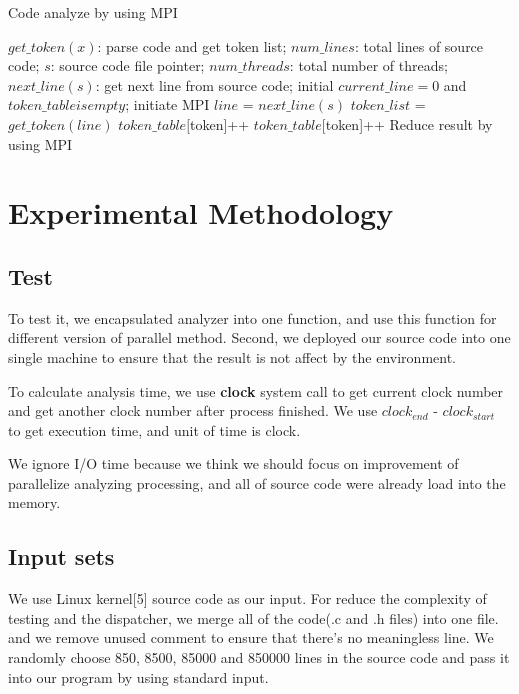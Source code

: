 \documentclass{acm_proc_article-sp}
\begin{document}
\begin{algorithm}[h]
\caption{Code analyze by using MPI}
\begin{algorithmic}[1]
\Require
$get\_token(x)$: parse code and get token list;
$num\_lines$: total lines of source code;
$s$: source code file pointer;
$num\_threads$: total number of threads;
$next\_line(s)$: get next line from source code;
			\State initial $current\_line=0$ and $token\_table is empty$;
			\State initiate MPI
            \State $line$ = $next\_line(s)$
			\State $token\_list$ = $get\_token(line)$
					\State $token\_table[$token]++
				\EndFor
			\EndIf
					\State $token\_table[$token]++
				\EndFor
			\EndIf
			\State Reduce result by using MPI
		\end{algorithmic}
\end{algorithm}


\section{Experimental Methodology}
\subsection{Test}
	To test it, we encapsulated analyzer into one function, and use this function for different
	version of parallel method.
	Second, we deployed our source code into one single machine to ensure that the result
	is not affect by the environment.

	To calculate analysis time, we use \textbf{clock} system call to get current clock number
	and get another clock number after process finished. We use \textit{$clock_{end}$} - \textit{$clock_{start}$}
	to get execution time, and unit of time is clock.

	We ignore I/O time because we think we should focus on improvement of parallelize analyzing
	processing, and all of source code were already load into the memory.
\subsection{Input sets}
	We use Linux kernel[5] source code as our input. For reduce the complexity of testing
	and the dispatcher, we merge all of the code(.c and .h files) into one file. and we remove
	unused comment to ensure that there's no meaningless line.
	We randomly choose 850, 8500, 85000 and 850000 lines in the source code and pass
	it into our program by using standard input.
\end{document}
